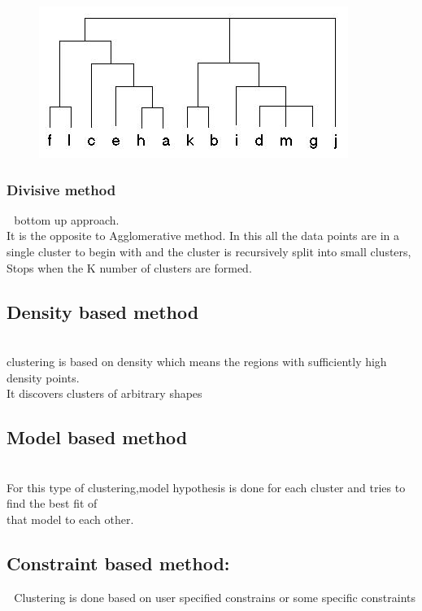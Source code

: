 \documentclass[11pt]{article}
\begin{document}
\begin{figure}\begin{center}
\includegraphics[scale=0.5]{Hierarch.jpg}
\end{center}

\end{figure}



\subsubsection{Divisive method}  bottom up approach.\\
It is the opposite to Agglomerative method. In this all the data points are in a single cluster to begin with and the cluster is recursively split into small clusters,\\
Stops when the K number of clusters are formed.\\
\subsection{Density based method }\\
clustering is based on density which means the regions with sufficiently high density points.\\
It discovers clusters of arbitrary shapes\\
\subsection{Model based method}\\
For this type of clustering,model hypothesis is done for each cluster and tries to find the best fit of \\
that model to each other.\\
\subsection{Constraint based method:}   Clustering is done based on user specified constrains or some specific constraints
\end{document}
